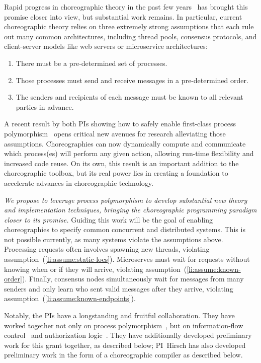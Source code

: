 Rapid progress in choreographic theory in the past few years~\citep[e.g.,][]{HirschG22,CruzFilipeGLMP22,CruzFilipeGLMP23,BatesK+25,SamuelsonHC25}
has brought this promise closer into view, but substantial work remains.
In particular, current choreographic theory relies on three extremely strong assumptions
that each rule out many common architectures, including thread pools, consensus protocols, and client-server models like web servers or microservice architectures:
\begin{enumerate}
  \item\label{li:assume:static-locs}
    There must be a pre-determined set of processes.
  \item\label{li:assume:known-order}
    Those processes must send and receive messages in a pre-determined order.
  \item\label{li:assume:known-endpoints}
    The senders and recipients of each message must be known to all relevant parties in advance.
\end{enumerate}

A recent result by both PIs showing how to safely enable first-class process polymorphism~\citep{SamuelsonHC25} opens critical new avenues for research alleviating those assumptions.
Choreographies can now dynamically compute and communicate which process(es) will perform any given action,
allowing run-time flexibility and increased code reuse.
On its own, this result is an important addition to the choreographic toolbox,
but its real power lies in creating a foundation to accelerate advances in choreographic technology.

\emph{We propose to leverage process polymorphism to develop substantial new theory and implementation techniques, bringing the choreographic programming paradigm closer to its promise.}
Guiding this work will be the goal of enabling choreographies to specify common concurrent and distributed systems.
This is not possible currently, as many systems violate the assumptions above.
Processing requests often involves spawning new threads, violating assumption~(\ref{li:assume:static-locs}).
Microserves must wait for requests without knowing when or if they will arrive, violating assumption~(\ref{li:assume:known-order}).
Finally, consensus nodes simultaneously wait for messages from many senders
and only learn who sent valid messages after they arrive,
violating assumption~(\ref{li:assume:known-endpoints}).

Notably, the PIs have a longstanding and fruitful collaboration.
They have worked together not only on process polymorphism~\cite{SamuelsonHC25}, but on information-flow control~\cite{SilverHCHZ23,HirschC21} and authorization logic~\cite{HirschACAT20}.
They have additionally developed preliminary work for this grant together, as described below; PI~Hirsch has also developed preliminary work in the form of a choreographic compiler as described below.


